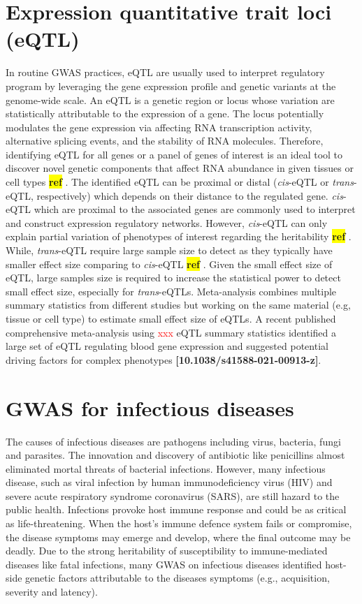 \documentclass[12pt,usletter, fancy]{elegantbook}
\newcommand{\reqref}[1][ref]{
  \colorbox{yellow}{\textbf{#1}}
}
\begin{document}
\section*{Expression quantitative trait loci (eQTL)}
In routine GWAS practices, eQTL are usually used to interpret regulatory program by leveraging the gene expression profile and genetic variants at the genome-wide scale.
An eQTL is a genetic region or locus whose variation are statistically attributable to the expression of a gene.
The locus potentially modulates the gene expression via affecting RNA transcription activity, alternative splicing events, and the stability of RNA molecules.
Therefore, identifying eQTL for all genes or a panel of genes of interest is an ideal tool to discover novel genetic components that affect RNA abundance in given tissues or cell types\reqref.
The identified eQTL can be proximal or distal (\textit{cis}-eQTL or \textit{trans}-eQTL, respectively) which depends on their distance to the regulated gene.
\textit{cis}-eQTL which are proximal to the associated genes are commonly used to interpret and construct expression regulatory networks.
However, \textit{cis}-eQTL can only explain partial variation of phenotypes of interest regarding the heritability\reqref.
While, \textit{trans}-eQTL require large sample size to detect as they typically have smaller effect size comparing to \textit{cis}-eQTL\reqref.
Given the small effect size of eQTL, large samples size is required to increase the statistical power to detect small effect size, especially for \textit{trans}-eQTLs.
Meta-analysis combines multiple summary statistics from different studies but working on the same material (e.g, tissue or cell type) to estimate small effect size of eQTLs.
A recent published comprehensive meta-analysis using \textcolor{red}{xxx} eQTL summary statistics identified a large set of eQTL regulating blood gene expression and suggested potential driving factors for complex phenotypes \textbf{[10.1038/s41588-021-00913-z]}.

\section*{GWAS for infectious diseases}
The causes of infectious diseases are pathogens including virus, bacteria, fungi and parasites.
The innovation and discovery of antibiotic like penicillins almost eliminated mortal threats of bacterial infections.
However, many infectious disease, such as viral infection by human immunodeficiency virus (HIV) and severe acute respiratory syndrome coronavirus (SARS), are still hazard to the public health.
Infections provoke host immune response and could be as critical as life-threatening.
When the host's immune defence system fails or compromise, the disease symptoms may emerge and develop, where the final outcome may be deadly.
Due to the strong heritability of susceptibility to immune-mediated diseases like fatal infections, many GWAS on infectious diseases identified host-side genetic factors attributable to the diseases symptoms (e.g., acquisition, severity and latency).
\end{document}
